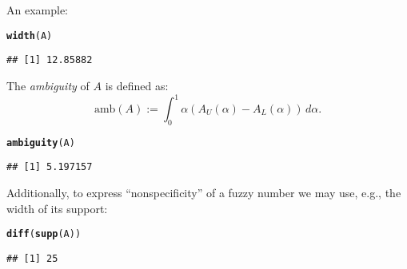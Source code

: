 \documentclass[11pt]{article}\usepackage[]{graphicx}\usepackage[]{color}
\makeatletter
\newcommand{\hlstd}[1]{\textcolor[rgb]{0.345,0.345,0.345}{#1}}%
\newcommand{\hlkwd}[1]{\textcolor[rgb]{0.737,0.353,0.396}{\textbf{#1}}}%
\newenvironment{kframe}{%
 \def\at@end@of@kframe{}%
 \ifinner\ifhmode%
  \def\at@end@of@kframe{\end{minipage}}%
  \begin{minipage}{\columnwidth}%
 \fi\fi%
 \def\FrameCommand##1{\hskip\@totalleftmargin \hskip-\fboxsep
 \colorbox{shadecolor}{##1}\hskip-\fboxsep
     \hskip-\linewidth \hskip-\@totalleftmargin \hskip\columnwidth}%
 \MakeFramed {\advance\hsize-\width
   \@totalleftmargin\z@ \linewidth\hsize
   \@setminipage}}%
 {\par\unskip\endMakeFramed%
 \at@end@of@kframe}
\newenvironment{knitrout}{}{} %
\makeatother
\begin{document}
\noindent
An example:

\begin{knitrout}\small
{}\color{fgcolor}\begin{kframe}
\begin{alltt}
\hlkwd{width}\hlstd{(A)}
\end{alltt}
\begin{verbatim}
## [1] 12.85882
\end{verbatim}
\end{kframe}
\end{knitrout}

\bigskip
The \textit{ambiguity} of $A$ \cite{DelgadoETAL1998:canonicalfn} is defined as:
\begin{equation}
\mathrm{amb}(A) := \int_0^1 \alpha\left(A_U(\alpha)-A_L(\alpha)\right)\,d\alpha.
\end{equation}

\begin{knitrout}\small
{}\color{fgcolor}\begin{kframe}
\begin{alltt}
\hlkwd{ambiguity}\hlstd{(A)}
\end{alltt}
\begin{verbatim}
## [1] 5.197157
\end{verbatim}
\end{kframe}
\end{knitrout}

\bigskip
Additionally, to express ``nonspecificity'' of a fuzzy number
we may use, e.g., the width of its support:

\begin{knitrout}\small
{}\color{fgcolor}\begin{kframe}
\begin{alltt}
\hlkwd{diff}\hlstd{(}\hlkwd{supp}\hlstd{(A))}
\end{alltt}
\begin{verbatim}
## [1] 25
\end{verbatim}
\end{kframe}
\end{knitrout}



\end{document}

